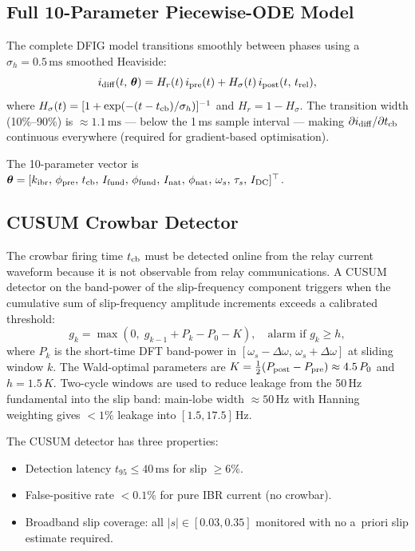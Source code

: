 \subsection{Full 10-Parameter Piecewise-ODE Model}
\label{sec:ch6_dfig_model}

The complete DFIG model transitions smoothly between phases using a
$\sigma_h = 0.5\,\text{ms}$ smoothed Heaviside:
\begin{equation}
  i_{\rm diff}(t,\,\boldsymbol{\theta}) =
    H_r(t)\,i_{\rm pre}(t) + H_\sigma(t)\,i_{\rm post}(t,\,t_{\rm rel}),
  \label{eq:ch6_dfig_full}
\end{equation}
where $H_\sigma(t) = [1 + \exp(-(t - t_{\rm cb})/\sigma_h)]^{-1}$ and
$H_r = 1 - H_\sigma$.  The transition width (10\%--90\%) is $\approx 1.1\,\text{ms}$
— below the 1\,ms sample interval — making $\partial i_{\rm diff}/\partial t_{\rm cb}$
continuous everywhere (required for gradient-based optimisation).

The 10-parameter vector is
$\boldsymbol{\theta} = [k_{\rm ibr},\,\phi_{\rm pre},\,t_{\rm cb},\,I_{\rm fund},\,
\phi_{\rm fund},\,I_{\rm nat},\,\phi_{\rm nat},\,\omega_s,\,\tau_s,\,I_{\rm DC}]^\top$.

\subsection{CUSUM Crowbar Detector}
\label{sec:ch6_cusum}

The crowbar firing time $t_{\rm cb}$ must be detected online from the relay
current waveform because it is not observable from relay communications.
A CUSUM detector on the band-power of the slip-frequency component triggers when
the cumulative sum of slip-frequency amplitude increments exceeds a calibrated
threshold:
\begin{equation}
  g_k = \max(0,\; g_{k-1} + P_k - P_0 - K), \quad \text{alarm if } g_k \geq h,
  \label{eq:ch6_cusum}
\end{equation}
where $P_k$ is the short-time DFT band-power in $[\omega_s - \Delta\omega,\,
\omega_s + \Delta\omega]$ at sliding window $k$.
The Wald-optimal parameters are $K = \tfrac{1}{2}(P_{\rm post} - P_{\rm pre})
\approx 4.5\,P_0$ and $h = 1.5\,K$.
Two-cycle windows are used to reduce leakage from the 50\,Hz fundamental into
the slip band: main-lobe width $\approx 50\,\text{Hz}$ with Hanning weighting
gives $< 1\%$ leakage into $[1.5, 17.5]\,\text{Hz}$.

The CUSUM detector has three properties:
\begin{itemize}
  \item Detection latency $t_{95} \leq 40\,\text{ms}$ for slip $\geq 6\%$.
  \item False-positive rate $< 0.1\%$ for pure IBR current (no crowbar).
  \item Broadband slip coverage: all $|s| \in [0.03, 0.35]$ monitored with no
    a~priori slip estimate required.
\end{itemize}

